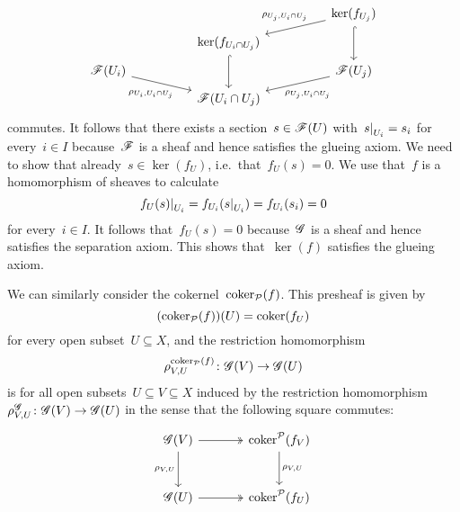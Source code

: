 \begin{example}
\begin{enumerate}
\begin{enumerate}[label=(S\arabic*)]
\[\begin{tikzcd}[column sep = huge, row sep = tiny]
              & {}
              & \ker(f_{U_j})
                \arrow{dl}[above left, near start]{\rho_{U_j, U_i \cap U_j}}
                \arrow[hook]{dd}
              \\
                {}
              & \ker(f_{U_i \cap U_j})
                \arrow[hook]{dd}
              & {}
              \\
                \Fs(U_i)
                \arrow{dr}[below left, near end]{\rho_{U_i, U_i \cap U_j}}
              & {}
              & \Fs(U_j)
                \arrow{dl}[below right, near end]{\rho_{U_j, U_i \cap U_j}}
              \\
                {}
              & \Fs(U_i \cap U_j)
              & {}
            \end{tikzcd}
          \]
          commutes.
          It follows that there exists a section~$s \in \mathscr{F}(U)$ with~$\restrict{s}{U_i} = s_i$ for every~$i \in I$ because~$\mathscr{F}$ is a sheaf and hence satisfies the glueing axiom.
          We need to show that already~$s \in \ker(f_U)$, i.e.\ that~$f_U(s) = 0$.
          We use that~$f$ is a homomorphism of sheaves to calculate
          \[
              \restrict{f_U(s)}{U_i}
            = f_{U_i}( \restrict{s}{U_i} )
            = f_{U_i}(s_i)
            = 0
          \]
          for every~$i \in I$.
          It follows that~$f_U(s) = 0$ because~$\mathscr{G}$ is a sheaf and hence satisfies the separation axiom.
          This shows that~$\ker(f)$ satisfies the glueing axiom.
      \end{enumerate}
      
      We can similarly consider the cokernel~$\operatorname{coker}_{\mathcal{P}}(f)$.
      This presheaf is given by
      \[
        (\operatorname{coker}_{\mathcal{P}}(f))(U) = \operatorname{coker}(f_U)
      \]
      for every open subset~$U \subseteq X$, and the restriction homomorphism
      \[
                \rho^{\operatorname{coker}_{\mathcal{P}}(f)}_{V,U}
        \colon  \mathscr{G}(V)
        \to     \mathscr{G}(U)
      \]
      is for all open subsets~$U \subseteq V \subseteq X$ induced by the restriction homomorphism~$\rho^{\mathscr{G}}_{V,U} \colon \mathscr{G}(V) \to \mathscr{G}(U)$ in the sense that the following square commutes:
      \[
        \begin{tikzcd}[sep = large]
            \Gs(V)
            \arrow[two heads]{r}
            \arrow{d}[left]{\rho_{V,U}}
          & \coker^{\Pcat}(f_V)
            \arrow{d}[right]{\rho_{V,U}}
          \\
            \Gs(U)
            \arrow[two heads]{r}
          & \coker^{\Pcat}(f_U)
        \end{tikzcd}
      \]
      

\end{enumerate}
\end{example}
